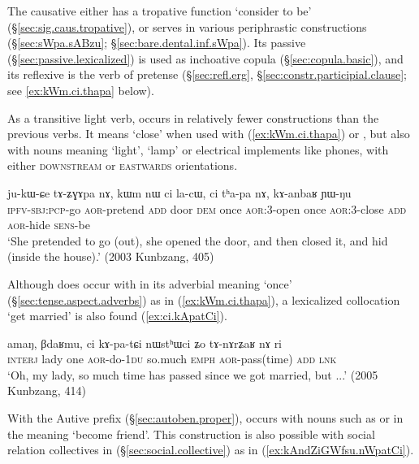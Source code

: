 The causative  either has a tropative function `consider to be' (§\ref{sec:sig.caus.tropative}), or serves in various periphrastic constructions (§\ref{sec:sWpa.sABzu}; §\ref{sec:bare.dental.inf.sWpa}). Its passive  (§\ref{sec:passive.lexicalized}) is used as inchoative copula (§\ref{sec:copula.basic}), and its reflexive is the verb of pretense  (§\ref{sec:refl.erg}, §\ref{sec:constr.participial.clause}; see \ref{ex:kWm.ci.thapa} below).

As a transitive light verb,  occurs in relatively fewer constructions than the previous verbs. It means `close' when used with  (\ref{ex:kWm.ci.thapa}) or , but also with nouns meaning `light', `lamp' or electrical implements like phones, with either \textsc{downstream} or \textsc{eastwards} orientations.

\begin{exe}
\ex \label{ex:kWm.ci.thapa}
\gll ju-kɯ-ɕe tɤ-ʑɣɤpa nɤ, kɯm nɯ ci la-cɯ, ci tʰa-pa nɤ, kɤ-anbaʁ ɲɯ-ŋu \\
\textsc{ipfv}-\textsc{sbj}:\textsc{pcp}-go \textsc{aor}-pretend \textsc{add} door \textsc{dem} once \textsc{aor}:3\flobv{}-open once \textsc{aor}:3\flobv{}-close \textsc{add} \textsc{aor}-hide \textsc{sens}-be \\
\glt `She pretended to go (out), she opened the door, and then closed it, and hid (inside the house).' (2003 Kunbzang, 405)
\end{exe}

Although  does occur with  in its adverbial meaning `once' (§\ref{sec:tense.aspect.adverbs}) as in (\ref{ex:kWm.ci.thapa}), a lexicalized collocation  `get married' is also found (\ref{ex:ci.kApatCi}).

\begin{exe}
\ex \label{ex:ci.kApatCi}
\gll amaŋ, βdaʁmu, ci kɤ-pa-tɕi nɯstʰɯci ʑo tɤ-nɤrʑaʁ nɤ ri \\
\textsc{interj} lady one \textsc{aor}-do-\textsc{1du} so.much \textsc{emph} \textsc{aor}-pass(time) \textsc{add} \textsc{lnk} \\
\glt `Oh, my lady, so much time has passed since we got married, but ...' (2005 Kunbzang, 414)
\end{exe}

With the Autive prefix (§\ref{sec:autoben.proper}),  occurs with nouns such as  or  in the meaning `become friend'. This construction is also possible with social relation collectives in  (§\ref{sec:social.collective}) as in (\ref{ex:kAndZiGWfsu.nWpatCi}).

